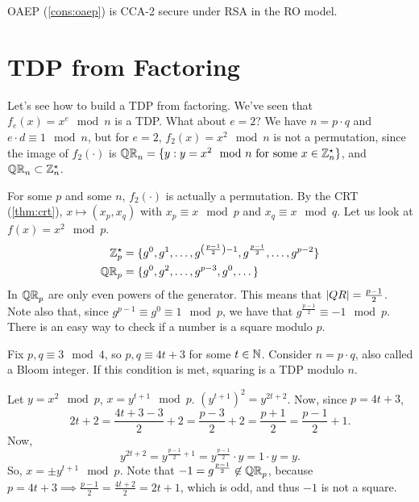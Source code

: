 \begin{theorem}
	\ac{OAEP} (\cref{cons:oaep}) is \ac{CCA}-2 secure under \ac{RSA} in the \ac{RO} model.
\end{theorem}

\section{\acl{TDP} from Factoring}

Let's see how to build a \ac{TDP} from factoring.
We've seen that $f_e(x) = x^e \mod n$ is a \ac{TDP}.
What about $e = 2$?
We have $n = p \cdot q$ and $e \cdot d \equiv 1 \mod n$, but for $e = 2$, $f_2(x) = x^2 \mod n$ is not a permutation, since the image of $f_2(\cdot)$ is $\QR[n] = \{ y : y = x^2 \mod n \text{ for some } x \in \Integers_n^{\star}\}$, and $\QR[n] \subset \Integers_n^{\star}$.

For some $p$ and some $n$, $f_2(\cdot)$ is actually a permutation. 
By the \ac{CRT} (\cref{thm:crt}), $x \mapsto (x_p, x_q)$ with $x_p \equiv x \mod p$ and $x_q \equiv x \mod q$.
Let us look at $f(x) = x^2 \mod p$.
\begin{align*}
	\Integers_p^{\star} & = \{
		g^0, g^1, \dots, g^{\left(\frac{p-1}{2}\right) - 1}, g^{\frac{p-1}{2}}, \dots, g^{p-2}
	\} \\
	\QR & = \{
		g^0, g^2, \dots, g^{p-3}, g^0, \dots
	\}
\end{align*}
In $\QR$ are only even powers of the generator.
This means that $\abs{QR} = \frac{p-1}{2}$.
Note also that, since $g^{p-1} \equiv g^0 \equiv 1 \mod p$, we have that $g^{\frac{p-1}{2}} \equiv -1 \mod p$.
There is an easy way to check if a number is a square modulo $p$.

Fix $p, q \equiv 3 \mod 4$, so $p, q \equiv 4 t + 3$ for some $t \in \NaturalsZ$.
Consider $n = p \cdot q$, also called a Bloom integer.
If this condition is met, squaring is a \ac{TDP} modulo $n$.

Let $y = x^2 \mod p$, $x = y^{t+1} \mod p$.
$\left(y^{t+1}\right)^2 = y^{2t+2}$.
Now, since $p = 4t + 3$,
\begin{equation*}
	2t + 2 =
	\frac{4t + 3 - 3}{2} + 2 =
	\frac{p-3}{2} + 2 =
	\frac{p+1}{2} =
	\frac{p - 1}{2} + 1.
\end{equation*}
Now,
\begin{equation*}
	y^{2t+2} =
	y^{\frac{p-1}{2} + 1} =
	y^{\frac{p-1}{2}} \cdot y =
	1 \cdot y = y.
\end{equation*}
So, $x = \pm y^{t+1} \mod p$.
Note that $-1 = g^{\frac{p-1}{2}} \not\in \QR$, because $p = 4t + 3 \implies \frac{p-1}{2} = \frac{4t + 2}{2} = 2t+1$, which is odd, and thus $-1$ is not a square.


